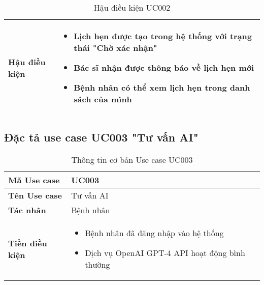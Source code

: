 \documentclass[../DoAn.tex]{subfiles}
\begin{document}
\begin{table}[H]
\centering
\begin{tabular}{|p{3cm}|p{10cm}|}
\hline
\textbf{Hậu điều kiện} & 
\begin{itemize}
    \item Lịch hẹn được tạo trong hệ thống với trạng thái "Chờ xác nhận"
    \item Bác sĩ nhận được thông báo về lịch hẹn mới
    \item Bệnh nhân có thể xem lịch hẹn trong danh sách của mình
\end{itemize} \\
\hline
\end{tabular}
\caption{Hậu điều kiện UC002}
\end{table}

\subsection{Đặc tả use case UC003 "Tư vấn AI"}
\label{subsection:2.3.3}

\begin{table}[H]
\centering
\begin{tabular}{|p{3cm}|p{10cm}|}
\hline
\textbf{Mã Use case} & UC003 \\
\hline
\textbf{Tên Use case} & Tư vấn AI \\
\hline
\textbf{Tác nhân} & Bệnh nhân \\
\hline
\textbf{Tiền điều kiện} & 
\begin{itemize}
    \item Bệnh nhân đã đăng nhập vào hệ thống
    \item Dịch vụ OpenAI GPT-4 API hoạt động bình thường
\end{itemize} \\
\hline
\end{tabular}
\caption{Thông tin cơ bản Use case UC003}
\end{table}
\end{document}
